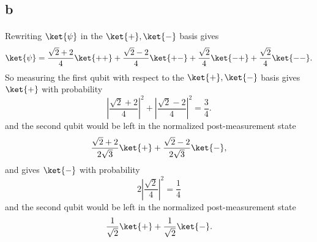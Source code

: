 \documentclass[letterpaper,12pt,oneside,onecolumn]{article}
\begin{document}
\subsection{b}
\paragraph{}
Rewriting $\ket{\psi}$ in the $\ket{+}, \ket{-}$ basis gives
$$\ket{\psi} = \frac{\sqrt{2} + 2}{4}\ket{++} + \frac{\sqrt{2}-2}{4}\ket{+-} + \frac{\sqrt{2}}{4}\ket{-+} + \frac{\sqrt{2}}{4}\ket{--}.$$
So measuring the first qubit with respect to the $\ket{+}, \ket{-}$ basis gives $\ket{+}$ with probability
$$|\frac{\sqrt{2}+2}{4}|^2+ |\frac{\sqrt{2}-2}{4}|^2 = \frac{3}{4}.$$
and the second qubit would be left in the normalized post-measurement state
$$ \frac{\sqrt{2} + 2}{2\sqrt{3}}\ket{+} + \frac{\sqrt{2}-2}{2\sqrt{3}}\ket{-},$$
and gives $\ket{-}$ with probability
$$2|\frac{\sqrt{2}}{4}|^2 = \frac{1}{4}$$
and the second qubit would be left in the normalized post-measurement state
$$\frac{1}{\sqrt{2}}\ket{+} + \frac{1}{\sqrt{2}}\ket{-} .$$
\end{document}
